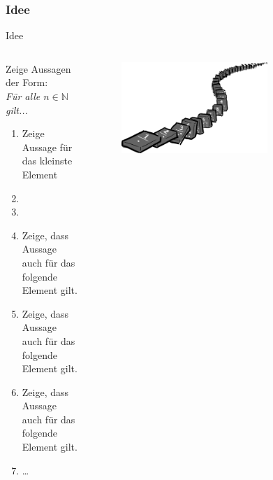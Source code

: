 \subsubsection{Idee}
\begin{frame}[fragile]{Idee}
\begin{columns}
    \begin{alertblock}{Zeige Aussagen der Form:\\\emph{Für alle $n\in\mathbb{N}$ gilt...}}
    \begin{enumerate}
        \item Zeige Aussage für das kleinste Element
        \item<1-> 
        \item<2-6,8> 
        \item<3-6> \footnotesize Zeige, dass Aussage auch für das folgende Element gilt.
        \item<4-6> \scriptsize Zeige, dass Aussage auch für das folgende Element gilt.
        \item<5-6> \tiny Zeige, dass Aussage auch für das folgende Element gilt.
        \item<6> \dots
    \end{enumerate}
    \end{alertblock}
    \begin{figure}
        \centering
        \includegraphics[width=0.7\textwidth]{figures/induction.png}
    \end{figure}
\end{columns}
\end{frame}

